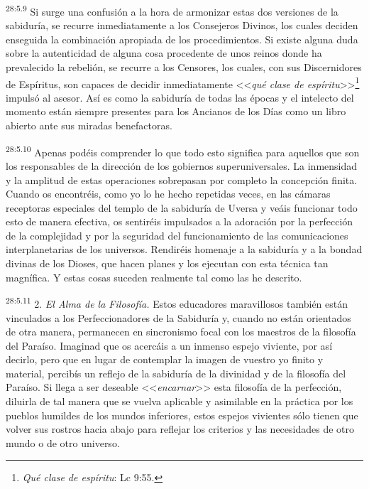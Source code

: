 \par
\textsuperscript{28:5.9} Si surge una confusión a la hora de armonizar estas dos versiones de la sabiduría, se recurre inmediatamente a los Consejeros Divinos, los cuales deciden enseguida la combinación apropiada de los procedimientos. Si existe alguna duda sobre la autenticidad de alguna cosa procedente de unos reinos donde ha prevalecido la rebelión, se recurre a los Censores, los cuales, con sus Discernidores de Espíritus, son capaces de decidir inmediatamente <<\textit{qué clase de espíritu}>>\footnote{\textit{Qué clase de espíritu}: Lc 9:55.} impulsó al asesor. Así es como la sabiduría de todas las épocas y el intelecto del momento están siempre presentes para los Ancianos de los Días como un libro abierto ante sus miradas benefactoras.

\par
\textsuperscript{28:5.10} Apenas podéis comprender lo que todo esto significa para aquellos que son los responsables de la dirección de los gobiernos superuniversales. La inmensidad y la amplitud de estas operaciones sobrepasan por completo la concepción finita. Cuando os encontréis, como yo lo he hecho repetidas veces, en las cámaras receptoras especiales del templo de la sabiduría de Uversa y veáis funcionar todo esto de manera efectiva, os sentiréis impulsados a la adoración por la perfección de la complejidad y por la seguridad del funcionamiento de las comunicaciones interplanetarias de los universos. Rendiréis homenaje a la sabiduría y a la bondad divinas de los Dioses, que hacen planes y los ejecutan con esta técnica tan magnífica. Y estas cosas suceden realmente tal como las he descrito.

\par
\textsuperscript{28:5.11} 2. \textit{El Alma de la Filosofía.} Estos educadores maravillosos también están vinculados a los Perfeccionadores de la Sabiduría y, cuando no están orientados de otra manera, permanecen en sincronismo focal con los maestros de la filosofía del Paraíso. Imaginad que os acercáis a un inmenso espejo viviente, por así decirlo, pero que en lugar de contemplar la imagen de vuestro yo finito y material, percibís un reflejo de la sabiduría de la divinidad y de la filosofía del Paraíso. Si llega a ser deseable <<\textit{encarnar}>> esta filosofía de la perfección, diluirla de tal manera que se vuelva aplicable y asimilable en la práctica por los pueblos humildes de los mundos inferiores, estos espejos vivientes sólo tienen que volver sus rostros hacia abajo para reflejar los criterios y las necesidades de otro mundo o de otro universo.

